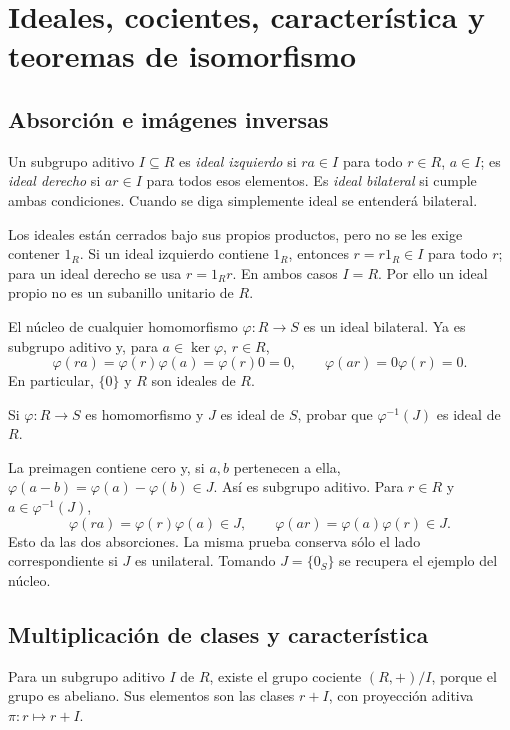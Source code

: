 \section{Ideales, cocientes, característica y teoremas de isomorfismo}\label{sec:anillos-ideales}

\subsection{Absorción e imágenes inversas}\label{tema:12-2-1}
\begin{defi}
Un subgrupo aditivo $I\subseteq R$ es \emph{ideal izquierdo} si $ra\in I$ para todo $r\in R$, $a\in I$; es \emph{ideal derecho} si $ar\in I$ para todos esos elementos. Es \emph{ideal bilateral} si cumple ambas condiciones. Cuando se diga simplemente ideal se entenderá bilateral.
\end{defi}
Los ideales están cerrados bajo sus propios productos, pero no se les exige contener $1_R$. Si un ideal izquierdo contiene $1_R$, entonces $r=r1_R\in I$ para todo $r$; para un ideal derecho se usa $r=1_Rr$. En ambos casos $I=R$. Por ello un ideal propio no es un subanillo unitario de $R$.

\begin{ejem}
El núcleo de cualquier homomorfismo $\varphi:R\to S$ es un ideal bilateral. Ya es subgrupo aditivo y, para $a\in\ker\varphi$, $r\in R$,
\[
\varphi(ra)=\varphi(r)\varphi(a)=\varphi(r)0=0,
\qquad
\varphi(ar)=0\varphi(r)=0.
\]
En particular, $\{0\}$ y $R$ son ideales de $R$.
\end{ejem}

\begin{ejer}\label{ejer:C12-preimagen}
Si $\varphi:R\to S$ es homomorfismo y $J$ es ideal de $S$, probar que $\varphi^{-1}(J)$ es ideal de $R$.
\end{ejer}
\begin{sol}
La preimagen contiene cero y, si $a,b$ pertenecen a ella, $\varphi(a-b)=\varphi(a)-\varphi(b)\in J$. Así es subgrupo aditivo. Para $r\in R$ y $a\in\varphi^{-1}(J)$,
\[
\varphi(ra)=\varphi(r)\varphi(a)\in J,\qquad
\varphi(ar)=\varphi(a)\varphi(r)\in J.
\]
Esto da las dos absorciones. La misma prueba conserva sólo el lado correspondiente si $J$ es unilateral. Tomando $J=\{0_S\}$ se recupera el ejemplo del núcleo.
\end{sol}

\subsection{Multiplicación de clases y característica}\label{tema:12-2-2}
Para un subgrupo aditivo $I$ de $R$, existe el grupo cociente $(R,+)/I$, porque el grupo es abeliano. Sus elementos son las clases $r+I$, con proyección aditiva $\pi:r\mapsto r+I$.

